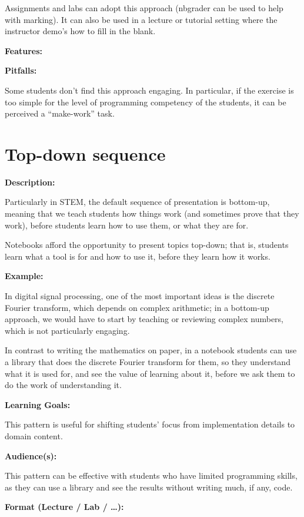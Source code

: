 \documentclass[]{book}
\begin{document}
Assignments and labs can adopt this approach (nbgrader can be used to
help with marking). It can also be used in a lecture or tutorial setting
where the instructor demo's how to fill in the blank.

\textbf{Features:}

\textbf{Pitfalls:}

Some students don't find this approach engaging. In particular, if the
exercise is too simple for the level of programming competency of the
students, it can be perceived a ``make-work'' task.

\section{Top-down sequence}\label{top-down-sequence}

\textbf{Description:}

Particularly in STEM, the default sequence of presentation is bottom-up,
meaning that we teach students how things work (and sometimes prove that
they work), before students learn how to use them, or what they are for.

Notebooks afford the opportunity to present topics top-down; that is,
students learn what a tool is for and how to use it, before they learn
how it works.

\textbf{Example:}

In digital signal processing, one of the most important ideas is the
discrete Fourier transform, which depends on complex arithmetic; in a
bottom-up approach, we would have to start by teaching or reviewing
complex numbers, which is not particularly engaging.

In contrast to writing the mathematics on paper, in a notebook students
can use a library that does the discrete Fourier transform for them, so
they understand what it is used for, and see the value of learning about
it, before we ask them to do the work of understanding it.

\textbf{Learning Goals:}

This pattern is useful for shifting students' focus from implementation
details to domain content.

\textbf{Audience(s):}

This pattern can be effective with students who have limited programming
skills, as they can use a library and see the results without writing
much, if any, code.

\textbf{Format (Lecture / Lab / \ldots{}):}
\end{document}
